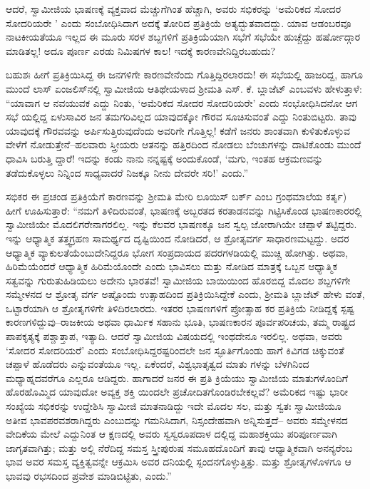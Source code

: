 ಆದರೆ, ಸ್ವಾಮೀಜಿಯ ಭಾಷಣಕ್ಕೆ ವ್ಯಕ್ತವಾದ ಮೆಚ್ಚುಗೆಗಿಂತ ಹೆಚ್ಚಾಗಿ, ಅವರು ಸಭಿಕರನ್ನು ‘ಅಮೆರಿಕದ ಸೋದರ ಸೋದರಿಯರೇ ’ ಎಂದು ಸಂಬೋಧಿಸಿದಾಗ ಅದಕ್ಕೆ ತೋರಿದ ಪ್ರತಿಕ್ರಿಯೆ ಅತ್ಯದ್ಭುತವಾದದ್ದು. ಯಾವ ಆಡಂಬರವೂ ನಾಟಕೀಯತೆಯೂ ಇಲ್ಲದ ಈ ಮೂರು ಸರಳ ಶಬ್ದಗಳಿಗೆ ಪ್ರತಿಕ್ರಿಯೆಯಾಗಿ ಸಭೆಗೆ ಸಭೆಯೇ ಹುಚ್ಚೆದ್ದು ಹರ್ಷೋದ್ಗಾರ ಮಾಡಿತಲ್ಲ! ಅದೂ ಪೂರ್ಣ ಎರಡು ನಿಮಿಷಗಳ ಕಾಲ! ಇದಕ್ಕೆ ಕಾರಣವೇನಿದ್ದಿರಬಹುದು?

ಬಹುಶಃ ಹೀಗೆ ಪ್ರತಿಕ್ರಿಯಿಸಿದ್ದ ಈ ಜನಗಳಿಗೇ ಕಾರಣವೇನೆಂದು ಗೊತ್ತಿದ್ದಿರಲಾರದು! ಈ ಸಭೆಯಲ್ಲಿ ಹಾಜರಿದ್ದ, ಹಾಗೂ ಮುಂದೆ ಲಾಸ್ ಏಂಜಲಿಸ್​ನಲ್ಲಿ ಸ್ವಾಮೀಜಿಯ ಆತಿಥೇಯಳಾದ ಶ್ರೀಮತಿ ಎಸ್. ಕೆ. ಬ್ಲಾಜೆಟ್ ಎಂಬವಳು ಹೇಳುತ್ತಾಳೆ: “ಯಾವಾಗ ಆ ನವಯುವಕ ಎದ್ದು ನಿಂತು, ‘ಅಮೆರಿಕದ ಸೋದರ ಸೋದರಿಯರೇ’ ಎಂದು ಸಂಭೋಧಿಸಿದನೋ ಆಗ ಸಭೆ ಯಲ್ಲಿದ್ದ ಏಳುಸಾವಿರ ಜನ ತಮಗರಿವಿಲ್ಲದ ಯಾವುದಕ್ಕೋ ಗೌರವ ಸೂಚಿಸುವಂತೆ ಎದ್ದು ನಿಂತುಬಿಟ್ಟರು. ತಾವು ಯಾವುದಕ್ಕೆ ಗೌರವವನ್ನು ಅರ್ಪಿಸುತ್ತಿರುವುದೆಂದು ಅವರಿಗೇ ಗೊತ್ತಿಲ್ಲ! ಕಡೆಗೆ ಜನರು ಶಾಂತವಾಗಿ ಕುಳಿತುಕೊಳ್ಳುವ ವೇಳೆಗೆ ನೋಡುತ್ತೇನೆ–ಹಲವಾರು ಸ್ತ್ರೀಯರು ಆತನನ್ನು ಹತ್ತಿರದಿಂದ ನೋಡಲು ಬೆಂಚುಗಳನ್ನು ದಾಟಿಕೊಂಡು ಮುಂದೆ ಧಾವಿಸಿ ಬರುತ್ತಿ ದ್ದಾರೆ! ಇದನ್ನು ಕಂಡು ನಾನು ನನ್ನಷ್ಟಕ್ಕೆ ಅಂದುಕೊಂಡೆ, ‘ಮಗು, ಇಂತಹ ಆಕ್ರಮಣವನ್ನು ತಡೆದುಕೊಳ್ಳಲು ನಿನ್ನಿಂದ ಸಾಧ್ಯವಾದರೆ ನಿಜಕ್ಕೂ ನೀನು ದೇವರೇ ಸರಿ!’ ಎಂದು.”

ಸಭಿಕರ ಈ ಪ್ರಚಂಡ ಪ್ರತಿಕ್ರಿಯೆಗೆ ಕಾರಣವನ್ನು ಶ್ರೀಮತಿ ಮೇರಿ ಲೂಯಿಸ್ ಬರ್ಕ್  ಎಂಬ ಗ್ರಂಥಮಾಲೆಯ ಕರ್ತೃ) ಹೀಗೆ ಊಹಿಸುತ್ತಾರೆ: “ನಮಗೆ ತಿಳಿದಿರುವಂತೆ, ಭಾಷಣಕ್ಕೆ ಅಬ್ಬರತದ ಕರತಾಡನವನ್ನು ಗಿಟ್ಟಿಸಿಕೊಂಡ ಭಾಷಣಕಾರರಲ್ಲಿ ಸ್ವಾಮೀಜಿಯೇ ಮೊದಲಿಗರೇನಾಗರಲಿಲ್ಲ. ಇನ್ನು ಕೆಲವರ ಭಾಷಣಕ್ಕೂ ಜನ ಸ್ವಲ್ಪ ಜೋರಾಗಿಯೇ ಚಪ್ಪಾಳೆ ತಟ್ಟಿದ್ದರು. ಇನ್ನು ಆಧ್ಯಾತ್ಮಿಕ ತತ್ತ್ವಗ್ರಹಣ ಸಾಮರ್ಥ್ಯದ ದೃಷ್ಟಿಯಿಂದ ನೋಡಿದರೆ, ಆ ಶ್ರೋತೃವರ್ಗ ಸಾಧಾರಣಮಟ್ಟದ್ದು. ಅದರ ಆಧ್ಯಾತ್ಮಿಕ ವ್ಯಾಕುಲತೆಯೆಂಬುದೇನಿದ್ದರೂ ಭೋಗ ಸಂಪ್ರದಾಯದ ಪದರಗಳಡಿಯಲ್ಲಿ ಮುಚ್ಚಿ ಹೋಗಿತ್ತು. ಅಥವಾ, ಹಿರಿಮೆಯೆಂದರೆ ಆಧ್ಯಾತ್ಮಿಕ ಹಿರಿಮೆಯೊಂದೇ ಎಂದು ಭಾವಿಸಲು ಮತ್ತು ನೋಡಿದ ಮಾತ್ರಕ್ಕೆ ಒಬ್ಬನ ಆಧ್ಯಾತ್ಮಿಕ ಸತ್ವವನ್ನು ಗುರುತುಹಿಡಿಯಲು ಅದೇನು ಭಾರತವೆ! ಸ್ವಾಮೀಜಿಯ ಬಾಯಿಯಿಂದ ಹೊರಬಿದ್ದ ಮೊದಲ ಶಬ್ದಗಳಿಗೇ ಸಮ್ಮೇಳನದ ಆ ಶ್ರೋತೃ ವರ್ಗ ಅಷ್ಟೊಂದು ಉತ್ಸಾಹದಿಂದ ಪ್ರತಿಕ್ರಿಯಿಸಿದ್ದೇಕೆ ಎಂದು, ಶ್ರೀಮತಿ ಬ್ಲಾಜೆಟ್ ಹೇಳು ವಂತೆ, ಒಟ್ಟಾರೆಯಾಗಿ ಆ ಶ್ರೋತೃಗಳಿಗೇ ತಿಳಿದಿರಲಾರದು. ಇತರರ ಭಾಷಣಗಳಿಗೆ ಪ್ರೋತ್ಸಾಹ ಕರ ಪ್ರತಿಕ್ರಿಯೆ ನೀಡಿದ್ದಕ್ಕೆ ಸ್ಪಷ್ಟ ಕಾರಣಗಳಿದ್ದುವು–ರಾಜಕೀಯ ಅಥವಾ ಧಾರ್ಮಿಕ ಸಹಾನು ಭೂತಿ, ಭಾಷಣಕಾರನ ಪೂರ್ವಪರಿಚಯ, ತಮ್ಮ ರಾಷ್ಟ್ರದ ಪಾಪಕೃತ್ಯಕ್ಕೆ ಪಶ್ಚಾತ್ತಾಪ, ಇತ್ಯಾದಿ. ಆದರೆ ಸ್ವಾಮೀಜಿಯ ವಿಷಯದಲ್ಲಿ ಇಂಥದೇನೂ ಇರಲಿಲ್ಲ. ಅಥವಾ, ಅವರು ‘ಸೋದರ ಸೋದರಿಯರೆ’ ಎಂದು ಸಂಬೋಧಿಸಿದ್ದರಷ್ಟರಿಂದಲೇ ಜನ ಸ್ಫೂರ್ತಿಗೊಂಡು ಹಾಗೆ ಕಿವಿಗಡ ಚಿಕ್ಕುವಂತೆ ಚಪ್ಪಾಳೆ ಹೊಡೆದರು ಎನ್ನುವಂತೆಯೂ ಇಲ್ಲ. ಏಕೆಂದರೆ, ವಿಶ್ವಭಾತೃತ್ವದ ಮಾತು ಗಳನ್ನು ಬೆಳಗಿನಿಂದ ಮಧ್ಯಾಹ್ನದವರೆಗೂ ಎಲ್ಲರೂ ಆಡಿದ್ದರು. ಹಾಗಾದರೆ ಜನರ ಈ ಪ್ರತಿ ಕ್ರಿಯೆಯು ಸ್ವಾಮೀಜಿಯ ಮಾತುಗಳೊಂದಿಗೆ ಹೊರಹೊಮ್ಮಿದ ಯಾವುದೋ ಅವ್ಯಕ್ತ ಶಕ್ತಿ ಯಿಂದಲೇ ಪ್ರಚೋದಿತಗೊಂಡಿರಬೇಕಲ್ಲವೆ? ಅಮೆರಿಕದ ಇಷ್ಟು ಭಾರೀ ಸಂಖ್ಯೆಯ ಸಭಿಕರನ್ನು ಉದ್ದೇಶಿಸಿ ಸ್ವಾಮೀಜಿ ಮಾತನಾಡಿದ್ದು ಇದೇ ಮೊದಲ ಸಲ, ಮತ್ತು ಸ್ವತಃ ಸ್ವಾಮೀಜಿಯೂ ಅತೀವ ಭಾವಪರವಶರಾಗಿದ್ದರು ಎಂಬುದನ್ನು ಗಮನಿಸಿದಾಗ, ನಿಸ್ಸಂದೇಹವಾಗಿ ಅನ್ನಿಸುತ್ತದೆ– ಅವರು ಸಮ್ಮೇಳನದ ವೇದಿಕೆಯ ಮೇಲೆ ಎದ್ದುನಿಂತ ಆ ಕ್ಷಣದಲ್ಲಿ ಅವರು ಸ್ವಸ್ವರೂಪದಾಳ ದಲ್ಲಿದ್ದ ಮಹಾಶಕ್ತಿಯು ಪರಿಪೂರ್ಣವಾಗಿ ಜಾಗೃತವಾಗಿತ್ತು; ಮತ್ತು ಅಲ್ಲಿ ನೆರೆದಿದ್ದ ಸಮಸ್ತ ಸ್ತ್ರೀಪುರುಷ ಸಮೂಹದೊಂದಿಗೆ ತಾವು ಆಧ್ಯಾತ್ಮಿಕವಾಗಿ ಅನನ್ಯರೆಂಬ ಭಾವ ಅವರ ಸಮಸ್ತ ವ್ಯಕ್ತಿತ್ವವನ್ನೇ ಆಕ್ರಮಿಸಿ ಅವರ ದನಿಯಲ್ಲಿ ಸ್ಪಂದನಗೊಳ್ಳುತ್ತಿತ್ತು. ಮತ್ತು ಶ್ರೋತೃಗಳೊಳಗೂ ಆ ಭಾವವು ರಭಸದಿಂದ ಪ್ರವೇಶ ಮಾಡಿಬಿಟ್ಟಿತು, ಎಂದು.”

